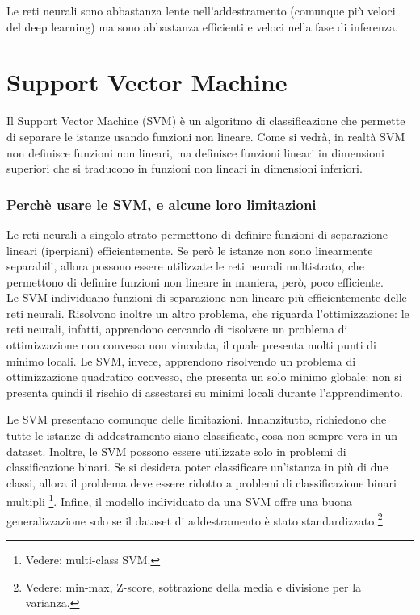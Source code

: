 Le reti neurali sono abbastanza lente nell'addestramento (comunque più veloci del deep learning) ma sono abbastanza efficienti e veloci nella fase di inferenza. 

\section{Support Vector Machine}
Il Support Vector Machine (SVM) è un algoritmo di classificazione che permette di separare le istanze usando funzioni non lineare. Come si vedrà, in realtà SVM non definisce funzioni non lineari, ma definisce funzioni lineari in dimensioni superiori che si traducono in funzioni non lineari in dimensioni inferiori. 

\subsubsection{Perchè usare le SVM, e alcune loro limitazioni}
Le reti neurali a singolo strato permettono di definire funzioni di separazione lineari (iperpiani) efficientemente. Se però le istanze non sono linearmente separabili, allora possono essere utilizzate le reti neurali multistrato, che permettono di definire funzioni non lineare in maniera, però, poco efficiente.\\
Le SVM individuano funzioni di separazione non lineare più efficientemente delle reti neurali. Risolvono inoltre un altro problema, che riguarda l'ottimizzazione: le reti neurali, infatti, apprendono cercando di risolvere un problema di ottimizzazione non convessa non vincolata, il quale presenta molti punti di minimo locali. Le SVM, invece, apprendono risolvendo un problema di ottimizzazione quadratico convesso, che presenta un solo minimo globale: non si presenta quindi il rischio di assestarsi su minimi locali durante l'apprendimento.

Le SVM presentano comunque delle limitazioni. Innanzitutto, richiedono che tutte le istanze di addestramento siano classificate, cosa non sempre vera in un dataset.
Inoltre, le SVM possono essere utilizzate solo in problemi di classificazione binari. Se si desidera poter classificare un'istanza in più di due classi, allora il problema deve essere ridotto a problemi di classificazione binari multipli \footnote{Vedere: multi-class SVM.}.
Infine, il modello individuato da una SVM offre una buona generalizzazione solo se il dataset di addestramento è stato standardizzato \footnote{Vedere: min-max, Z-score, sottrazione della media e divisione per la varianza.}

